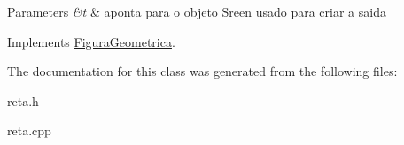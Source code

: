 \begin{DoxyParams}{Parameters}
{\em \&t} & aponta para o objeto Sreen usado para criar a saida \\
\hline
\end{DoxyParams}


Implements \hyperlink{classFiguraGeometrica_a8ee8dedc060b6059a805ea091aef2c41}{Figura\+Geometrica}.



The documentation for this class was generated from the following files\+:\begin{DoxyCompactItemize}
\item 
reta.\+h\item 
reta.\+cpp\end{DoxyCompactItemize}
